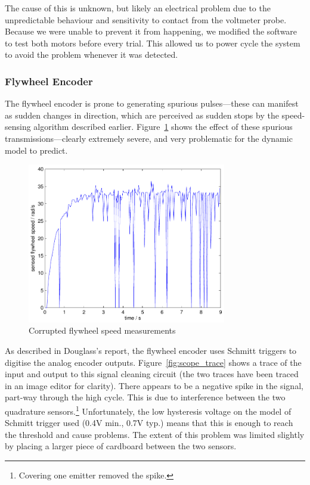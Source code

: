 \documentclass{IIBproject}
\begin{document}
The cause of this is unknown, but likely an electrical problem due to the
unpredictable behaviour and sensitivity to contact from the voltmeter probe.
Because we were unable to prevent it from happening, we modified the software
to test both motors before every trial. This allowed us to power cycle the
system to avoid the problem whenever it was detected.

\subsubsection{Flywheel Encoder}
\label{sec:flywheel_encoder}

The flywheel encoder is prone to generating spurious pulses---these can
manifest as sudden changes in direction, which are perceived as sudden stops
by the speed-sensing algorithm described earlier.
Figure~\ref{fig:bad_fly_speed} shows the effect of these spurious
transmissions---clearly extremely severe, and very problematic for the dynamic
model to predict.

\begin{figure}[htpb]
  \begin{center}
    \includegraphics[height=7cm]{bad_fly_speed.pdf}
    \end{center}
    \caption{Corrupted flywheel speed measurements}
    \label{fig:bad_fly_speed}
    \end{figure}

As described in Douglass's report, the flywheel encoder uses Schmitt triggers
to digitise the analog encoder outputs. Figure~\ref{fig:scope_trace} shows a
trace of the input and output to this signal cleaning circuit (the two traces
have been traced in an image editor for clarity). There appears to be a
negative spike in the signal, part-way through the high cycle.  This is due to
interference between the two quadrature sensors.\footnote{Covering one emitter removed
the spike.} Unfortunately, the low hysteresis voltage on the model of Schmitt
trigger used (0.4V min., 0.7V typ.) means that this is enough to reach the
threshold and cause problems. The extent of this problem was limited slightly
by placing a larger piece of cardboard between the two sensors.
\end{document}
